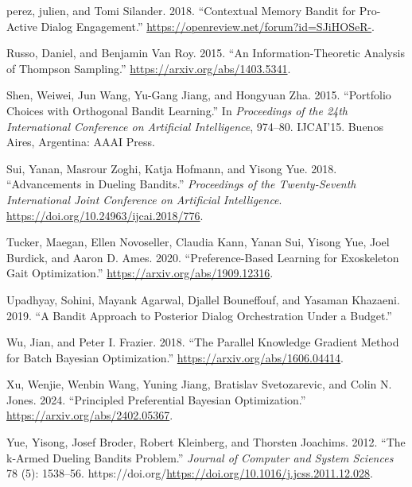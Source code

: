 \documentclass[
  letterpaper,
  DIV=11,
  numbers=noendperiod,
  oneside]{scrreprt}
\newlength{\cslhangindent}
\newenvironment{CSLReferences}[2] %
 {\begin{list}{}{%
  \setlength{\itemindent}{0pt}
  \setlength{\leftmargin}{0pt}
  \setlength{\parsep}{0pt}
  \ifodd #1
   \setlength{\leftmargin}{\cslhangindent}
   \setlength{\itemindent}{-1\cslhangindent}
  \fi
  \setlength{\itemsep}{#2\baselineskip}}}
 {\end{list}}
\theoremstyle{remark}
\begin{document}
\begin{CSLReferences}{1}{0}
perez, julien, and Tomi Silander. 2018. {``Contextual Memory Bandit for
Pro-Active Dialog Engagement.''}
\url{https://openreview.net/forum?id=SJiHOSeR-}.

Russo, Daniel, and Benjamin Van Roy. 2015. {``An Information-Theoretic
Analysis of Thompson Sampling.''} \url{https://arxiv.org/abs/1403.5341}.

Shen, Weiwei, Jun Wang, Yu-Gang Jiang, and Hongyuan Zha. 2015.
{``Portfolio Choices with Orthogonal Bandit Learning.''} In
\emph{Proceedings of the 24th International Conference on Artificial
Intelligence}, 974--80. IJCAI'15. Buenos Aires, Argentina: AAAI Press.

Sui, Yanan, Masrour Zoghi, Katja Hofmann, and Yisong Yue. 2018.
{``Advancements in Dueling Bandits.''} \emph{Proceedings of the
Twenty-Seventh International Joint Conference on Artificial
Intelligence}. \url{https://doi.org/10.24963/ijcai.2018/776}.

Tucker, Maegan, Ellen Novoseller, Claudia Kann, Yanan Sui, Yisong Yue,
Joel Burdick, and Aaron D. Ames. 2020. {``Preference-Based Learning for
Exoskeleton Gait Optimization.''}
\url{https://arxiv.org/abs/1909.12316}.

Upadhyay, Sohini, Mayank Agarwal, Djallel Bouneffouf, and Yasaman
Khazaeni. 2019. {``A Bandit Approach to Posterior Dialog Orchestration
Under a Budget.''}

Wu, Jian, and Peter I. Frazier. 2018. {``The Parallel Knowledge Gradient
Method for Batch Bayesian Optimization.''}
\url{https://arxiv.org/abs/1606.04414}.

Xu, Wenjie, Wenbin Wang, Yuning Jiang, Bratislav Svetozarevic, and Colin
N. Jones. 2024. {``Principled Preferential Bayesian Optimization.''}
\url{https://arxiv.org/abs/2402.05367}.

Yue, Yisong, Josef Broder, Robert Kleinberg, and Thorsten Joachims.
2012. {``The k-Armed Dueling Bandits Problem.''} \emph{Journal of
Computer and System Sciences} 78 (5): 1538--56.
https://doi.org/\url{https://doi.org/10.1016/j.jcss.2011.12.028}.


\end{CSLReferences}
\end{document}
